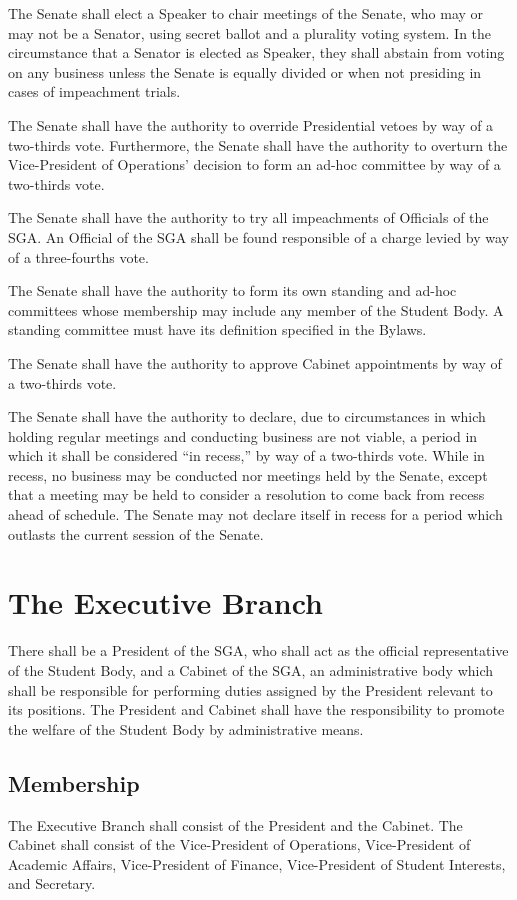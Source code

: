 \documentclass[12pt,oneside]{scrreprt}
\begin{document}
The Senate shall elect a Speaker to chair meetings of the Senate, who may or may not be a Senator, using secret ballot and a plurality voting system. In the circumstance that a Senator is elected as Speaker, they shall abstain from voting on any business unless the Senate is equally divided or when not presiding in cases of impeachment trials.

The Senate shall have the authority to override Presidential vetoes by way of a two-thirds vote. Furthermore, the Senate shall have the authority to overturn the Vice-President of Operations' decision to form an ad-hoc committee by way of a two-thirds vote.

The Senate shall have the authority to try all impeachments of Officials of the SGA. An Official of the SGA shall be found responsible of a charge levied by way of a three-fourths vote.

The Senate shall have the authority to form its own standing and ad-hoc committees whose membership may include any member of the Student Body. A standing committee must have its definition specified in the Bylaws. 

The Senate shall have the authority to approve Cabinet appointments by way of a two-thirds vote.

The Senate shall have the authority to declare, due to circumstances in which holding regular meetings and conducting business are not viable, a period in which it shall be considered ``in recess,'' by way of a two-thirds vote. While in recess, no business may be conducted nor meetings held by the Senate, except that a meeting may be held to consider a resolution to come back from recess ahead of schedule. The Senate may not declare itself in recess for a period which outlasts the current session of the Senate.

\chapter{The Executive Branch}
There shall be a President of the SGA, who shall act as the official representative of the Student Body, and a Cabinet of the SGA, an administrative body which shall be responsible for performing duties assigned by the President relevant to its positions. The President and Cabinet shall have the responsibility to promote the welfare of the Student Body by administrative means.

\section{Membership}
The Executive Branch shall consist of the President and the Cabinet. The Cabinet shall consist of the Vice-President of Operations, Vice-President of Academic Affairs, Vice-President of Finance, Vice-President of Student Interests, and Secretary. 
\end{document}
